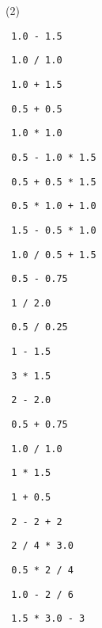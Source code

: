 \begin{exercise}
 

\begin{sltasks}[resume=true](2)
    \task
    \begin{items}
      \item \texttt{ 1.0 - 1.5 }
      \item \texttt{ 1.0 / 1.0 }
      \item \texttt{ 1.0 + 1.5 }
      \item \texttt{ 0.5 + 0.5 }
      \item \texttt{ 1.0 * 1.0 }
    \end{items}
    \task
    \begin{items}
      \item \texttt{ 0.5 - 1.0 * 1.5 }
      \item \texttt{ 0.5 + 0.5 * 1.5 }
      \item \texttt{ 0.5 * 1.0 + 1.0 }
      \item \texttt{ 1.5 - 0.5 * 1.0 }
      \item \texttt{ 1.0 / 0.5 + 1.5 }
    \end{items}
    \task
    \begin{items}
      \item \texttt{ 0.5 - 0.75 }
      \item \texttt{ 1 / 2.0 }
      \item \texttt{ 0.5 / 0.25 }
      \item \texttt{ 1 - 1.5 }
      \item \texttt{ 3 * 1.5 }
    \end{items}
    \task
    \begin{items}
      \item \texttt{ 2 - 2.0 }
      \item \texttt{ 0.5 + 0.75 }
      \item \texttt{ 1.0 / 1.0 }
      \item \texttt{ 1 * 1.5 }
      \item \texttt{ 1 + 0.5 }
    \end{items}
    \task
    \begin{items}
      \item \texttt{ 2 - 2 + 2 }
      \item \texttt{ 2 / 4 * 3.0 }
      \item \texttt{ 0.5 * 2 / 4 }
      \item \texttt{ 1.0 - 2 / 6 }
      \item \texttt{ 1.5 * 3.0 - 3 }

\end{items}
\end{sltasks}
\end{exercise}
